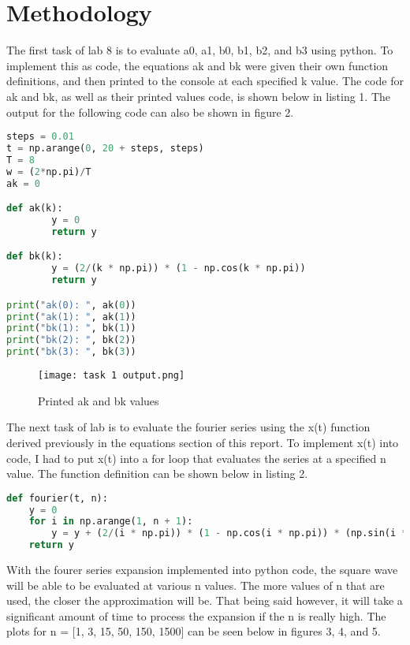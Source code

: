 \documentclass[12pt]{report}
\begin{document}
\section{Methodology}
\hspace{\parindent}The first task of lab 8 is to evaluate a0, a1, b0, b1, b2, and b3 using python. To implement this as code, the equations ak and bk were given their own function definitions, and then printed to the console at each specified k value. The code for ak and bk, as well as their printed values code, is shown below in listing 1. The output for the following code can also be shown in figure 2.
\begin{lstlisting}[language=Python, caption=Code for ak and bk values]
steps = 0.01
t = np.arange(0, 20 + steps, steps)
T = 8
w = (2*np.pi)/T
ak = 0

def ak(k):
        y = 0
        return y

def bk(k):
        y = (2/(k * np.pi)) * (1 - np.cos(k * np.pi))
        return y

print("ak(0): ", ak(0))
print("ak(1): ", ak(1))
print("bk(1): ", bk(1))
print("bk(2): ", bk(2))
print("bk(3): ", bk(3))
\end{lstlisting}
\begin{figure}[h!]
    \centering
    \texttt{[image: task 1 output.png]}
    \caption{Printed ak and bk values}
    \label{Figure x:}
\end{figure}
\hspace{\parindent}The next task of lab is to evaluate the fourier series using the x(t) function derived previously in the equations section of this report. To implement x(t) into code, I had to put x(t) into a for loop that evaluates the series at a specified n value. The function definition can be shown below in listing 2.
\begin{lstlisting}[language=Python, caption=Code for fourier series]
def fourier(t, n):
    y = 0
    for i in np.arange(1, n + 1):
        y = y + (2/(i * np.pi)) * (1 - np.cos(i * np.pi)) * (np.sin(i * w * t))       
    return y
\end{lstlisting}
\hspace{\parindent}With the fourer series expansion implemented into python code, the square wave will be able to be evaluated at various n values. The more values of n that are used, the closer the approximation will be. That being said however, it will take a significant amount of time to process the expansion if the n is really high. The plots for n = [1, 3, 15, 50, 150, 1500] can be seen below in figures 3, 4, and 5.
\end{document}
